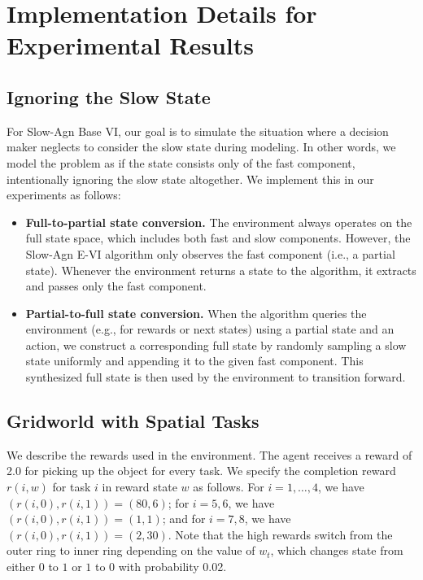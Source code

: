 \documentclass[11pt, notitlepage]{article}
\newcommand{\1}{\mathbbm{1}}
\begin{document}
\clearpage 


\section{Implementation Details for Experimental Results}
\label{app:exp_details}


\subsection{Ignoring the Slow State}
\label{sec:app:ignore}
For Slow-Agn Base VI, our goal is to simulate the situation where a decision maker neglects to consider the slow state during modeling. In other words, we model the problem as if the state consists only of the fast component, intentionally ignoring the slow state altogether. We implement this in our experiments as follows:
\begin{itemize}
    \item \textbf{Full-to-partial state conversion.} The environment always operates on the full state space, which includes both fast and slow components. However, the Slow-Agn E-VI algorithm only observes the fast component (i.e., a partial state). Whenever the environment returns a state to the algorithm, it extracts and passes only the fast component.
    \item \textbf{Partial-to-full state conversion.} When the algorithm queries the environment (e.g., for rewards or next states) using a partial state and an action, we construct a corresponding full state by randomly sampling a slow state uniformly and appending it to the given fast component. This synthesized full state is then used by the environment to transition forward.
\end{itemize}




\subsection{Gridworld with Spatial Tasks}
\label{app:gridworld}
We describe the rewards used in the environment. The agent receives a reward of 2.0 for picking up the object for every task. We specify the completion reward $r(i,w)$ for task $i$ in reward state $w$ as follows. For $i =1,\ldots,4$, we have $(r(i,0), r(i,1)) = (80,6)$; for $i=5, 6$, we have $(r(i,0), r(i,1)) = (1,1)$; and for $i=7,8$, we have $(r(i,0),r(i,1)) = (2,30)$. Note that the high rewards switch from the outer ring to inner ring depending on the value of $w_t$, which changes state from either $0$ to $1$ or $1$ to $0$ with probability 0.02.
\end{document}
